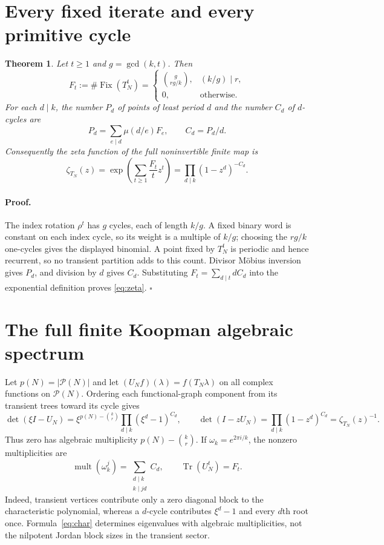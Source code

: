 \documentclass[9pt]{extarticle}
\newtheorem{theorem}{Theorem}
\begin{document}
\section{Every fixed iterate and every primitive cycle}
\begin{theorem}\label{thm:ledger}
Let $t\ge1$ and $g=\gcd(k,t)$.  Then
\[
 F_t:=\#\operatorname{Fix}(T_N^t)=
 \begin{cases}
 \displaystyle\binom{g}{rg/k},&(k/g)\mid r,\\[2pt]
 0,&\text{otherwise}.
 \end{cases}
\]
For each $d\mid k$, the number $P_d$ of points of least period $d$ and the
number $C_d$ of $d$-cycles are
\[
 P_d=\sum_{e\mid d}\mu(d/e)F_e,\qquad C_d=P_d/d.
\]
Consequently the zeta function of the full noninvertible finite map is
\begin{equation}\label{eq:zeta}
 \zeta_{T_N}(z)=\exp\!\left(\sum_{t\ge1}\frac{F_t}{t}z^t\right)
 =\prod_{d\mid k}(1-z^d)^{-C_d}.
\end{equation}
\end{theorem}

\paragraph{Proof.}
The index rotation $\rho^t$ has $g$ cycles, each of length $k/g$.  A fixed
binary word is constant on each index cycle, so its weight is a multiple of
$k/g$; choosing the $rg/k$ one-cycles gives the displayed binomial.  A point
fixed by $T_N^t$ is periodic and hence recurrent, so no transient partition
adds to this count.  Divisor M\"obius inversion gives $P_d$, and division by
$d$ gives $C_d$.  Substituting
$F_t=\sum_{d\mid t}dC_d$ into the exponential definition proves
\eqref{eq:zeta}. \hfill$\square$

\section{The full finite Koopman algebraic spectrum}
Let $p(N)=|\mathcal P(N)|$ and let $(U_Nf)(\lambda)=f(T_N\lambda)$ on all
complex functions on $\mathcal P(N)$.  Ordering each functional-graph
component from its transient trees toward its cycle gives
\begin{equation}\label{eq:char}
 \det(\xi I-U_N)=\xi^{p(N)-\binom{k}{r}}
 \prod_{d\mid k}(\xi^d-1)^{C_d},\qquad
 \det(I-zU_N)=\prod_{d\mid k}(1-z^d)^{C_d}=\zeta_{T_N}(z)^{-1}.
\end{equation}
Thus zero has algebraic multiplicity $p(N)-\binom{k}{r}$.  If
$\omega_k=e^{2\pi i/k}$, the nonzero multiplicities are
\[
 \operatorname{mult}(\omega_k^j)
 =\sum_{\substack{d\mid k\\k\mid jd}}C_d,\qquad
 \operatorname{Tr}(U_N^t)=F_t.
\]
Indeed, transient vertices contribute only a zero diagonal block to the
characteristic polynomial, whereas a $d$-cycle contributes $\xi^d-1$ and
every $d$th root once.  Formula~\eqref{eq:char} determines eigenvalues with
algebraic multiplicities, not the nilpotent Jordan block sizes in the
transient sector.
\end{document}
